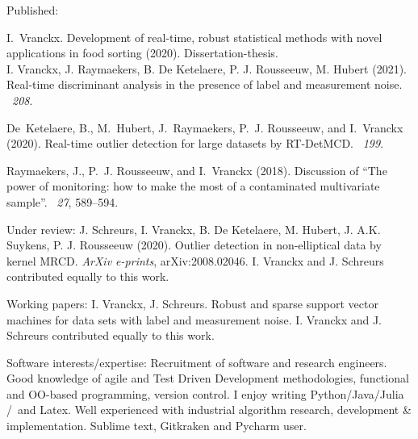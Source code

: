\documentclass[10pt,a4paper]{article}
\begin{document}
\spacedhrule{0.5em}{-0.4em}


\inlineheadsection  %
{Published:}
{
	I.~Vranckx. Development of real-time, robust statistical methods with novel applications in food sorting (2020). Dissertation-thesis. \\	
	\hangindent=3.5mm
	I. Vranckx, J. Raymaekers, B. De Ketelaere, P. J. Rousseeuw, M. Hubert (2021).
	\newblock Real-time discriminant analysis in the presence of label and measurement noise.
	~{\em 208}.	
	
	De~Ketelaere, B., M.~Hubert, J.~Raymaekers, P.~J. Rousseeuw, and I.~Vranckx	(2020).
	\newblock Real-time outlier detection for large datasets by {RT-DetMCD}.
	~{\em 199}. 		
	
	Raymaekers, J., P.~J. Rousseeuw, and I.~Vranckx (2018).
	\newblock Discussion of ``{T}he power of monitoring: how to make the most of a contaminated multivariate sample''.
	~{\em 27}, 589--594. 
}
\vspace{0.5em}
\inlineheadsection
{Under review:}
{
	\hangindent=3.5mm
	J. Schreurs, I. Vranckx, B. De Ketelaere, M. Hubert, J. A.K. Suykens, P. J. Rousseeuw (2020). Outlier detection in non-elliptical data by kernel MRCD. \textit{ArXiv e-prints}, arXiv:2008.02046. I. Vranckx and J. Schreurs contributed equally to this work.}

\vspace{0.5em}
\inlineheadsection
{Working papers:}
{	\hangindent=3.5mm
	I. Vranckx, J. Schreurs. Robust and sparse support vector machines for data sets with label and measurement noise. I. Vranckx and J. Schreurs contributed equally to this work.}

\spacedhrule{1.6em}{-0.4em}


\inlineheadsection  %
{Software interests/expertise:}
{Recruitment of software and research engineers.  Good knowledge of agile and Test Driven Development methodologies, functional and OO-based programming, version control. I enjoy writing \nsp Python/\nsp Java/\nsp Julia /\nsp \CPP~and Latex. Well experienced with industrial algorithm research, development \& implementation. Sublime text, Gitkraken and Pycharm user.}
\end{document}
